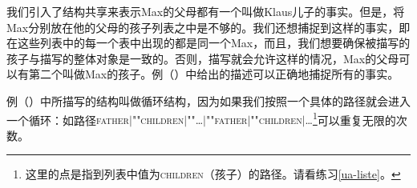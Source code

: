我们引入了结构共享来表示Max的父母都有一个叫做Klaus儿子的事实。但是，将Max分别放在他的父母的孩子列表之中是不够的。我们还想捕捉到这样的事实，即在这些列表中的每一个表中出现的都是同一个Max，而且，我们想要确保被描写的孩子与描写的整体对象是一致的。否则，描写就会允许这样的情况，Max的父母可以有第二个叫做Max的孩子。例（）中给出的描述可以正确地捕捉所有的事实。
\begin{figure}
\ea
\label{bsp-avm-zyklen}
 
\z
\vspace{-\baselineskip}\end{figure}%
例（）中所描写的结构叫做循环结构，因为如果我们按照一个具体的路径就会进入一个循环：如路径\textsc{father$|$""children$|$""\ldots$|$""father$|$""children$|$\ldots}\footnote{%
这里的点是指到列表中值为\textsc{children}（孩子）的路径。请看练习\ref{ua-liste}。
}可以重复无限的次数。

